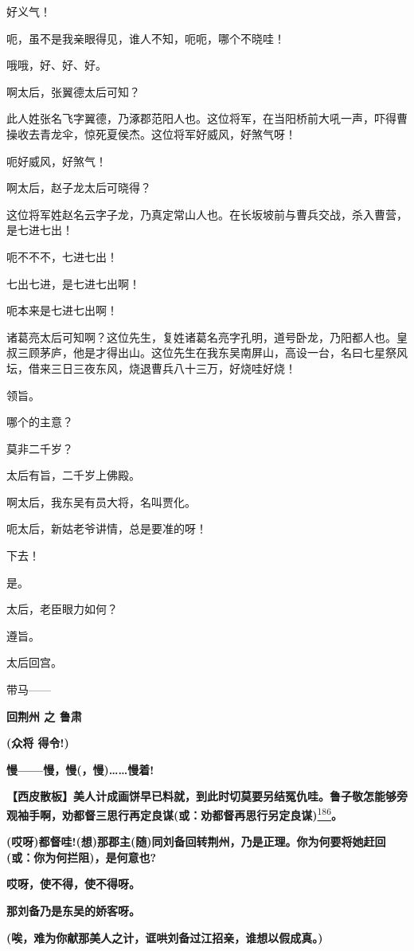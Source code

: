 好义气！

呃，虽不是我亲眼得见，谁人不知，呃呃，哪个不晓哇！

哦哦，好、好、好。

啊太后，张翼德太后可知？

此人姓张名飞字翼德，乃涿郡范阳人也。这位将军，在当阳桥前大吼一声，吓得曹操收去青龙伞，惊死夏侯杰。这位将军好威风，好煞气呀！

呃好威风，好煞气！

啊太后，赵子龙太后可晓得？

这位将军姓赵名云字子龙，乃真定常山人也。在长坂坡前与曹兵交战，杀入曹营，是七进七出！

呃不不不，七进七出！

七出七进，是七进七出啊！

呃本来是七进七出啊！

诸葛亮太后可知啊？这位先生，复姓诸葛名亮字孔明，道号卧龙，乃阳都人也。皇叔三顾茅庐，他是才得出山。这位先生在我东吴南屏山，高设一台，名曰七星祭风坛，借来三日三夜东风，烧退曹兵八十三万，好烧哇好烧！

领旨。

哪个的主意？

莫非二千岁？

太后有旨，二千岁上佛殿。

啊太后，我东吴有员大将，名叫贾化。

呃太后，新姑老爷讲情，总是要准的呀！

下去！

是。

太后，老臣眼力如何？

遵旨。

太后回宫。

带马------

\textbf{回荆州 之 鲁肃}

\textbf{(众将 得令!)}

\textbf{慢------慢，慢(，慢)\ldots{}\ldots{}慢着!}

\textbf{【西皮散板】美人计成画饼早已料就，到此时切莫要另结冤仇哇。鲁子敬怎能够旁观袖手啊，劝都督三思行再定良谋(或：劝都督再思行另定良谋)}\protect\hyperlink{fn186}{\textsuperscript{186}}\textbf{。}

\textbf{(哎呀)都督哇!(想)那郡主(随)同刘备回转荆州，乃是正理。你为何要将她赶回(或：你为何拦阻)，是何意也?}

\textbf{哎呀，使不得，使不得呀。}

\textbf{那刘备乃是东吴的娇客呀。}

\textbf{(唉，难为你献那美人之计，诓哄刘备过江招亲，谁想以假成真。)}

